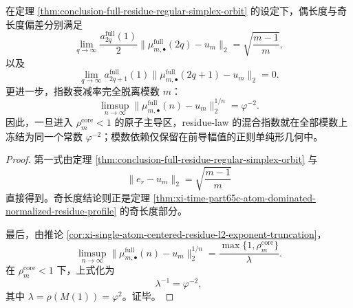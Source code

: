 \begin{corollary}\label{cor:conclusion-full-residue-phi-square-universal-exponent}
在定理 \ref{thm:conclusion-full-residue-regular-simplex-orbit} 的设定下，偶长度与奇长度偏差分别满足
\[
\lim_{q\to\infty}
\frac{a_{2q}^{\mathrm{full}}(1)}{2}
\bigl\|\mu_{m,\bullet}^{\mathrm{full}}(2q)-u_m\bigr\|_2
=
\sqrt{\frac{m-1}{m}},
\]
以及
\[
\lim_{q\to\infty}
a_{2q+1}^{\mathrm{full}}(1)
\bigl\|\mu_{m,\bullet}^{\mathrm{full}}(2q+1)-u_m\bigr\|_2
=
0.
\]
更进一步，指数衰减率完全脱离模数 \(m\)：
\[
\limsup_{n\to\infty}
\bigl\|\mu_{m,\bullet}^{\mathrm{full}}(n)-u_m\bigr\|_2^{1/n}
=
\varphi^{-2}.
\]
因此，一旦进入 \(\rho_m^{\mathrm{core}}<1\) 的原子主导区，residue-law 的混合指数就在全部模数上冻结为同一个常数 \(\varphi^{-2}\)；模数依赖仅保留在前导幅值的正则单纯形几何中。
\end{corollary}
\begin{proof}
第一式由定理 \ref{thm:conclusion-full-residue-regular-simplex-orbit} 与
\[
\|e_r-u_m\|_2=\sqrt{\frac{m-1}{m}}
\]
直接得到。奇长度结论则正是定理 \ref{thm:xi-time-part65c-atom-dominated-normalized-residue-profile} 的奇长度部分。

最后，由推论 \ref{cor:xi-single-atom-centered-residue-l2-exponent-truncation}，
\[
\limsup_{n\to\infty}
\bigl\|\mu_{m,\bullet}^{\mathrm{full}}(n)-u_m\bigr\|_2^{1/n}
=
\frac{\max\{1,\rho_m^{\mathrm{core}}\}}{\lambda}.
\]
在 \(\rho_m^{\mathrm{core}}<1\) 下，上式化为
\[
\lambda^{-1}=\varphi^{-2},
\]
其中 \(\lambda=\rho(M(1))=\varphi^2\)。证毕。
\end{proof}

